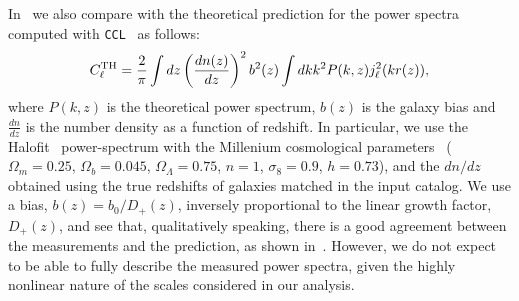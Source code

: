 \documentclass[\docopts]{\docclass}
\begin{document}
In~ we also compare with the theoretical prediction for the power spectra computed with \texttt{CCL}~\citep{2019ApJS..242....2C} as follows:
\begin{equation}
C_{\ell}^{\rm TH} = \frac{2}{\pi}\int{dz} \left(\frac{dn(z)}{dz}\right)^{2} b^{2}(z) \int{dk k^{2} P(k,z)j^{2}_{\ell}(kr(z))},
\end{equation}
where $P(k,z)$ is the theoretical power spectrum, $b(z)$ is the galaxy bias and $\frac{dn}{dz}$ is the number density as a function of redshift. In particular, we use the Halofit~\citep{2012ApJ...761..152T} power-spectrum with the Millenium cosmological parameters~\citep{2005Nature.435.629S} ($\Omega_{m}=0.25$, $\Omega_{b}=0.045$, $\Omega_{\Lambda}=0.75$, $n=1$, $\sigma_{8}=0.9$, $h=0.73$), and the $dn/dz$ obtained using the true redshifts of galaxies matched in the input catalog. We use a bias, $b(z) = b_{0}/D_{+}(z)$, inversely proportional to the linear growth factor\citep{1980lssu.book.....P}, $D_{+}(z)$, and see that, qualitatively speaking, there is a good agreement between the measurements and the prediction, as shown in~. %
However, we do not expect to be able to fully describe the measured power spectra, given the highly nonlinear nature of the scales considered in our analysis.
\end{document}
